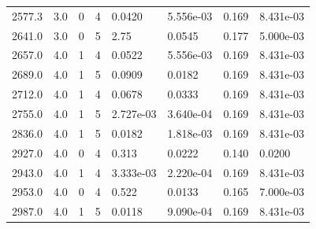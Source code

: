 \documentclass[preview]{standalone}
\begin{document}
{{{\begin{tabular}{L{1.2cm}C{1.2cm} C{0.3cm}C{0.5cm} C{1.4cm}C{1.4cm} C{1.4cm}C{1.4cm}}
  2577.3  &   3.0  & 0     &  4 &  0.0420  & 5.556e-03  & 0.169 &  8.431e-03   \\ 
  2641.0  &   3.0  & 0     &  5 &  2.75  & 0.0545  & 0.177 &  5.000e-03   \\ 
  2657.0  &   4.0  & 1     &  4 &  0.0522  & 5.556e-03  & 0.169 &  8.431e-03   \\ 
  2689.0  &   4.0  & 1     &  5 &  0.0909  & 0.0182  & 0.169 &  8.431e-03   \\ 
  2712.0  &   4.0  & 1     &  4 &  0.0678  & 0.0333  & 0.169 &  8.431e-03   \\ 
  2755.0  &   4.0  & 1     &  5 &  2.727e-03  & 3.640e-04  & 0.169 &  8.431e-03   \\ 
  2836.0  &   4.0  & 1     &  5 &  0.0182  & 1.818e-03  & 0.169 &  8.431e-03   \\ 
  2927.0  &   4.0  & 0     &  4 &  0.313  & 0.0222  & 0.140 &  0.0200   \\ 
  2943.0  &   4.0  & 1     &  4 &  3.333e-03  & 2.220e-04  & 0.169 &  8.431e-03   \\ 
  2953.0  &   4.0  & 0     &  4 &  0.522  & 0.0133  & 0.165 &  7.000e-03   \\ 
  2987.0  &   4.0  & 1     &  5 &  0.0118  & 9.090e-04  & 0.169 &  8.431e-03   \\ 
\hline 
\end{tabular} 

}}}
\end{document}

